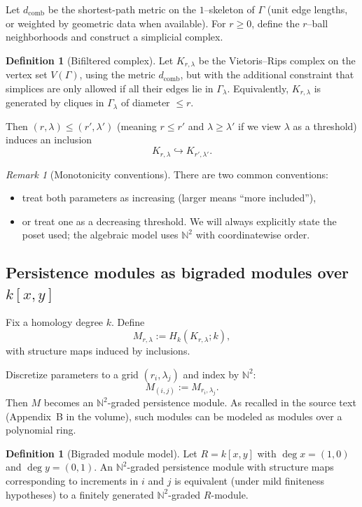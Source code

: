 \documentclass[11pt,oneside]{amsbook}
\numberwithin{equation}{section}
\theoremstyle{plain}
\theoremstyle{definition}
\newtheorem{definition}[theorem]{Definition}
\theoremstyle{remark}
\newtheorem{remark}[theorem]{Remark}
\newcommand{\N}{\mathbb{N}}
\begin{document}
Let $d_{\mathrm{comb}}$ be the shortest-path metric on the $1$--skeleton of $\Gamma$ (unit edge lengths, or weighted by geometric data when available).
For $r\ge 0$, define the $r$--ball neighborhoods and construct a simplicial complex.

\begin{definition}[Bifiltered complex]
Let $K_{r,\lambda}$ be the Vietoris--Rips complex on the vertex set $V(\Gamma)$, using the metric $d_{\mathrm{comb}}$, but with the additional constraint that simplices are only allowed if all their edges lie in $\Gamma_\lambda$.
Equivalently, $K_{r,\lambda}$ is generated by cliques in $\Gamma_\lambda$ of diameter $\le r$.
\end{definition}

Then $(r,\lambda)\le (r',\lambda')$ (meaning $r\le r'$ and $\lambda\ge \lambda'$ if we view $\lambda$ as a threshold) induces an inclusion
\[
K_{r,\lambda}\hookrightarrow K_{r',\lambda'}.
\]

\begin{remark}[Monotonicity conventions]
There are two common conventions:
\begin{itemize}
\item treat both parameters as increasing (larger means ``more included''),
\item or treat one as a decreasing threshold.
We will always explicitly state the poset used; the algebraic model uses $\N^2$ with coordinatewise order.
\end{itemize}
\end{remark}

\subsection{Persistence modules as bigraded modules over $k[x,y]$}
\label{sec:modules_over_poly}

Fix a homology degree $k$.
Define
\[
M_{r,\lambda} := H_k(K_{r,\lambda};k),
\]
with structure maps induced by inclusions.

Discretize parameters to a grid $(r_i,\lambda_j)$ and index by $\N^2$:
\[
M_{(i,j)} := M_{r_i,\lambda_j}.
\]
Then $M$ becomes an $\N^2$-graded persistence module.
As recalled in the source text (Appendix~B in the  volume), such modules can be modeled as modules over a polynomial ring.

\begin{definition}[Bigraded module model]
Let $R=k[x,y]$ with $\deg x=(1,0)$ and $\deg y=(0,1)$.
An $\N^2$-graded persistence module with structure maps corresponding to increments in $i$ and $j$ is equivalent (under mild finiteness hypotheses) to a finitely generated $\N^2$-graded $R$-module.
\end{definition}
\end{document}
